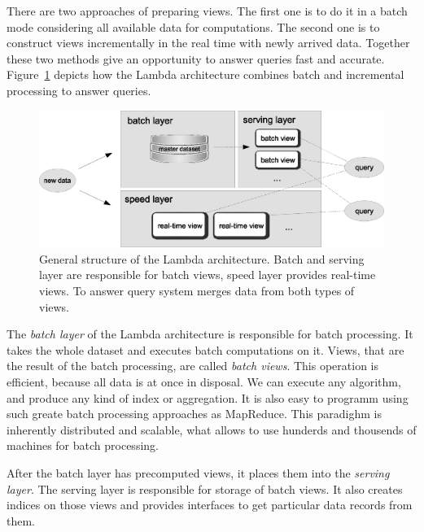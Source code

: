 There are two approaches of preparing views.
The first one is to do it in a batch mode considering all available data for computations.
The second one is to construct views incrementally in the real time with newly arrived data.
Together these two methods give an opportunity to answer queries fast and accurate.
Figure~\ref{fig:lambda_architecture} depicts how the Lambda architecture combines batch and incremental processing to answer queries.

\begin{figure}[h]
  \centering
  \includegraphics [width=1.0\textwidth]{images/LambdaArchitecture}
  \caption{General structure of the Lambda architecture. Batch and serving layer are responsible for batch views, speed layer provides real-time views. To answer query system merges data from both types of views.}
  \label{fig:lambda_architecture}
\end{figure}

The \textit{batch layer} of the Lambda architecture is responsible for batch processing.
It takes the whole dataset and executes batch computations on it.
Views, that are the result of the batch processing, are called \textit{batch views}.
This operation is efficient, because all data is at once in disposal.
We can execute any algorithm, and produce any kind of index or aggregation.
It is also easy to programm using such greate batch processing approaches as MapReduce.
This paradighm is inherently distributed and scalable, what allows to use hunderds and thousends of machines for batch processing.

After the batch layer has precomputed views, it places them into the \textit{serving layer}.
The serving layer is responsible for storage of batch views.
It also creates indices on those views and provides interfaces to get particular data records from them.

